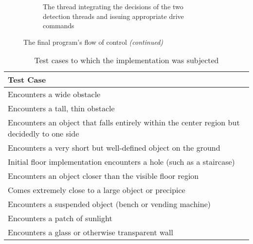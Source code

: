 \documentclass[12pt]{report}
\begin{document}
\begin{figure}
\begin{subfigure}{\textwidth}
\caption{The thread integrating the decisions of the two detection threads and issuing appropriate drive commands}
\label{fig:pilot}
\end{subfigure}
\captionsetup{list=false}
\caption{The final program's flow of control \textit{(continued)}}
\label{fig:runtimecont}
\end{figure}

\begin{table}
\caption{Test cases to which the implementation was subjected}
\label{tab:tests}
\begin{tabular}{| p{\textwidth} |}
\hline
\textbf{Test Case} \\
\hline\hline
Encounters a wide obstacle \\
\hline
Encounters a tall, thin obstacle \\
\hline
Encounters an object that falls entirely within the center region but decidedly to one side \\
\hline
Encounters a very short but well-defined object on the ground \\
\hline
Initial floor implementation encounters a hole (such as a staircase) \\
\hline
Encounters an object closer than the visible floor region \\
\hline
Comes extremely close to a large object or precipice \\
\hline
Encounters a suspended object (bench or vending machine) \\
\hline
Encounters a patch of sunlight \\
\hline
Encounters a glass or otherwise transparent wall \\
\hline
\end{tabular}
\end{table}
\end{document}
